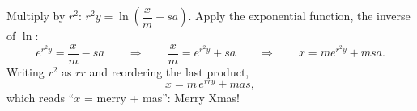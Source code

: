 Multiply by $r^2$: $r^2y=\ln\left(\dfrac {x}{m}-sa\right)$. Apply the exponential function, the inverse of $\ln$:
\[
e^{r^2y}=\dfrac {x}{m}-sa\qquad\Longrightarrow\qquad\dfrac {x}{m}=e^{r^2y}+sa\qquad\Longrightarrow\qquad x=m e^{r^2y}+msa .
\]
Writing $r^2$ as $rr$ and reordering the last product,
\[
\boxed{x=m\,e^{rry}+mas},
\]
which reads ``$x$ = merry + mas'': Merry Xmas!
